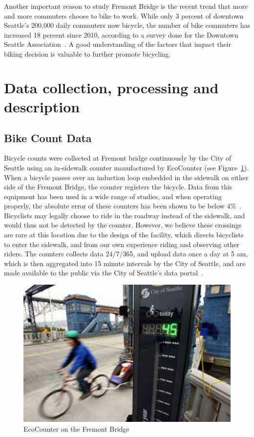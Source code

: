 \documentclass [11pt, proquest] {uwthesis}[2015/03/03]
\begin{document}
Another important reason to study Fremont Bridge is the recent trend that more and more commuters choose to bike to work. While only 3 percent of downtown Seattle's 200,000 daily commuters now bicycle, the number of bike commuters has increased 18 percent since 2010, according to a survey done for the Downtown Seattle Association~\cite{downtown2013}. A good understanding of the factors that impact their biking decision is valuable to further promote bicycling. 


\section{Data collection, processing and description}
\label{sec:data}

\subsection{Bike Count Data}
Bicycle counts were collected at Fremont bridge continuously by the City of Seattle using an in-sidewalk counter manufactured by EcoCounter (see Figure~\ref{fig:ecoCounter}). When a bicycle passes over an induction loop embedded in the sidewalk on either side of the Fremont Bridge, the counter
registers the bicycle. Data from this equipment has been used in a wide range of studies, and when operating properly, the absolute error of these counters has been shown to be below 4\%~\cite{Nordback09}. Bicyclists may legally choose to ride in the roadway instead of the sidewalk, and would thus not be detected by the counter. However, we believe these crossings are rare at this location due to the design of the facility, which directs bicyclists to enter the sidewalk, and from our own experience riding and observing other riders. The counters collects data 24/7/365, and upload data once a day at 5 am, which is then aggregated into 15 minute intervals by the City of Seattle, and are made available to the public via the City of Seattle's data portal~\cite{City-of-Seattle:aa,City-of-Seattle:ab}.

\begin{figure}
   \includegraphics[width=1\textwidth]{figures/FremontBikeEcoCounter.jpg} 
  \caption{EcoCounter on the Fremont Bridge}
  \label{fig:ecoCounter}
\end{figure}
\end{document}
